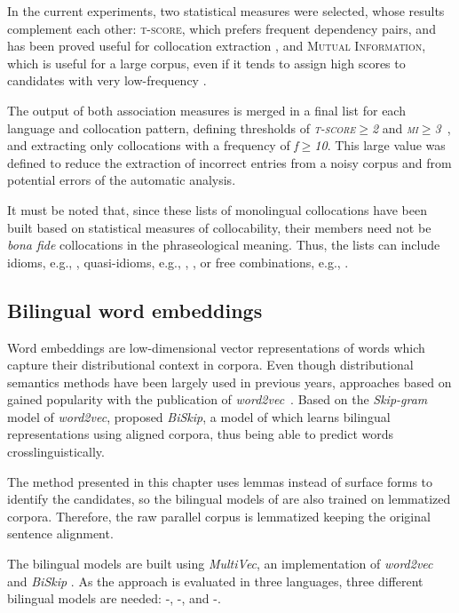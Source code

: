 \documentclass[output=paper
,modfonts
,nonflat]{langsci/langscibook}
\begin{document}
In the current experiments, two statistical measures were selected, whose results
complement each other: \textsc{t-score}, which prefers frequent dependency pairs,
and has been proved useful for collocation extraction \citep{krenn2001}, and
\textsc{Mutual Information}, which is useful for a large corpus, even if it
tends to assign high scores to candidates with very low-frequency \citep{pecina2010lexical}.

The output of both association measures is merged in a final list for each
language and collocation pattern, defining thresholds of \emph{\textsc{t-score$\geq$2}} and
\emph{\textsc{mi}$\geq$3}~\citep{stubbs1995}, and extracting only collocations with a frequency
of \emph{f$\geq$10}. This large value was defined to reduce the extraction of incorrect
entries from a noisy corpus and from potential errors of the automatic analysis.

It must be noted that, since these lists of monolingual collocations have been built
based on statistical measures of collocability, their members need not be
\emph{bona fide} collocations in the phraseological meaning. Thus, the lists can include
idioms, e.g., , quasi-idioms, e.g., , \citep{melcuk98}, or free combinations, e.g., .

%
\subsection{Bilingual word embeddings}
\label{garcia:sec:models}
Word embeddings are low-dimensional vector representations of words which
capture their distributional context in corpora. Even though distributional
semantics methods have been largely used in previous years, approaches based
on  gained popularity with the publication of \emph{word2vec}~\citep{mikolov2013}.
Based on the \emph{Skip-gram} model of \emph{word2vec}, \citet{bivec} proposed
\emph{BiSkip}, a model of  which learns bilingual representations
using aligned corpora, thus being able to predict words crosslinguistically.

The method presented in this chapter uses lemmas instead of surface forms to identify the
 candidates, so the bilingual models of  are also trained on
lemmatized corpora. Therefore, the raw parallel corpus is lemmatized keeping the original sentence alignment.

The bilingual models are built 
using \emph{MultiVec},
an implementation of \emph{word2vec} and \emph{BiSkip} \citep{MultiVec}. As the approach
is evaluated in three languages, three different bilingual models are needed:
-, -, and -.
\end{document}
